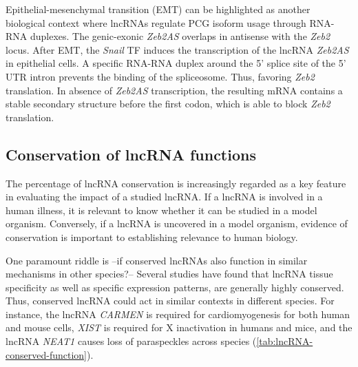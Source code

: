 Epithelial-mesenchymal transition (EMT) can be highlighted as another biological context where lncRNAs regulate PCG isoform usage through RNA-RNA duplexes. The genic-exonic \textit{Zeb2AS} overlaps in antisense with the \textit{Zeb2} locus. After EMT, the \textit{Snail} TF induces the transcription of the lncRNA \textit{Zeb2AS} in epithelial cells. A specific RNA-RNA duplex around the 5’ splice site of the 5’ UTR intron prevents the binding of the spliceosome.\autocite{beltran_2008_zeb2} Thus, favoring \textit{Zeb2} translation. In absence of \textit{Zeb2AS} transcription, the resulting mRNA contains a stable secondary structure before the first codon, which is able to block \textit{Zeb2} translation.\autocite{beltran_2008_zeb2,romero_2018_splicing}

\subsection{Conservation of lncRNA functions}
\label{paragraph:conservation_func}

The percentage of lncRNA conservation is increasingly regarded as a key feature in evaluating the impact of a studied lncRNA. If a lncRNA is involved in a human illness, it is relevant to know whether it can be studied in a model organism. Conversely, if a lncRNA is uncovered in a model organism, evidence of conservation is important to establishing relevance to human biology.

One paramount riddle is --if conserved lncRNAs also function in similar mechanisms in other species?-- Several studies have found that lncRNA tissue specificity as well as specific expression patterns, are generally highly conserved.\autocite{hezroni_2015_principles,ulitsky_2016_evolution} Thus, conserved lncRNA could act in similar contexts in different species. For instance, the lncRNA \textit{CARMEN} is required for cardiomyogenesis for both human and mouse cells,\autocite{ulitsky_2016_evolution} \textit{XIST} is required for X inactivation in humans and mice,\autocite{ulitsky_2016_evolution} and the lncRNA \textit{NEAT1} causes loss of paraspeckles across species (\autoref{tab:lncRNA-conserved-function}). 

